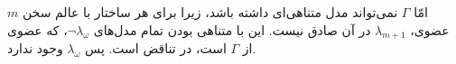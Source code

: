 \documentclass[12pt, 14paper]{article}
\begin{document}
\begin{enumerate}
\begin{ans}
  امّا $\Gamma$ نمی‌تواند مدل متناهی‌ای داشته باشد، زیرا برای هر ساختار با عالم سخن $m$ عضوی، $\lambda_{m+1}$ در آن صادق نیست. این با متناهی بودن تمام مدل‌های $\neg \lambda_\omega$، که عضوی از $\Gamma$ است، در تناقض است. پس $\lambda_\omega$ وجود ندارد.
\end{ans}

\end{enumerate}
\end{document}
